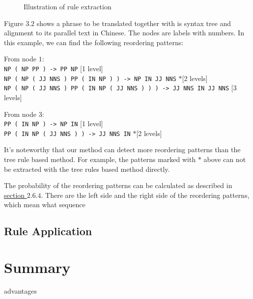 \begin{figure}[H]
\centering

\caption{Illustration of rule extraction}
\end{figure}

Figure $3.2$ shows a phrase to be translated together with is syntax tree and alignment to its parallel text in Chinese. The nodes are labels with numbers. In this example, we can find the following reordering patterns:

From node $1$:\\
\texttt{NP ( {\color{red}NP PP} ) -> PP NP} \hfill [1 level]\\
\texttt{NP ( NP ( {\color{red}JJ NNS} ) PP ( {\color{red}IN NP} ) ) -> NP IN JJ NNS} \hfill $*$[2 levels]\\
\texttt{NP ( NP ( {\color{red}JJ NNS} ) PP ( {\color{red}IN} NP ( {\color{red}JJ NNS} ) ) ) -> JJ NNS IN JJ NNS} \hfill [3 levels]

From node $3$:\\
\texttt{PP ( {\color{red}IN NP} ) -> NP IN} \hfill [1 level]\\
\texttt{PP ( {\color{red}IN} NP ( {\color{red}JJ NNS} ) ) -> JJ NNS IN} \hfill $*$[2 levels]

It's noteworthy that our method can detect more reordering patterns than the tree rule based method. For example, the patterns marked with $*$ above can not be extracted with the tree rules based method directly.

The probability of the reordering patterns can be calculated as described in \hyperref[general]{section $2.6.4$}. There are the left side and the right side of the reordering patterns, which mean what sequence

\subsection{Rule Application}

\section{Summary}

advantages